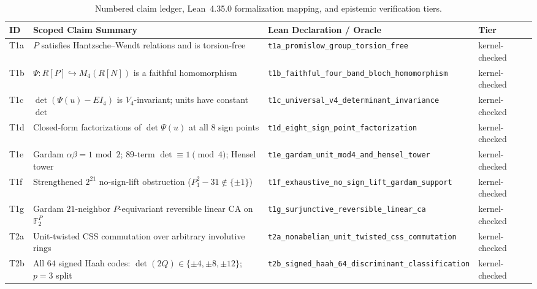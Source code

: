 \documentclass[11pt,reqno]{amsart}
\theoremstyle{definition}
\newcommand{\F}{\mathbb{F}}
\newcommand{\tierK}{\textsf{\scriptsize\textcolor{accentgreen}{kernel-checked}}}
\begin{document}
\begin{table}[htbp]
\centering
\caption{Numbered claim ledger, Lean~4.35.0 formalization mapping, and epistemic verification tiers.}
\label{tab:claims}
\scriptsize
\setlength{\tabcolsep}{3.5pt}
\begin{tabularx}{\textwidth}{@{}l>{\raggedright\arraybackslash}X>{\raggedright\arraybackslash}p{4.35cm}l@{}}
\toprule
\textbf{ID} & \textbf{Scoped Claim Summary} & \textbf{Lean Declaration / Oracle} & \textbf{Tier} \\
\midrule
\textsf{T1a} & $P$ satisfies Hantzsche--Wendt relations and is torsion-free & \texttt{t1a\_promislow\_group\_}\newline\texttt{torsion\_free} & \tierK{} \\
\textsf{T1b} & $\Psi : R[P] \hookrightarrow M_4(R[N])$ is a faithful homomorphism & \texttt{t1b\_faithful\_four\_band\_}\newline\texttt{bloch\_homomorphism} & \tierK{} \\
\textsf{T1c} & $\det(\Psi(u)-EI_4)$ is $V_4$-invariant; units have constant $\det$ & \texttt{t1c\_universal\_v4\_}\newline\texttt{determinant\_invariance} & \tierK{} \\
\textsf{T1d} & Closed-form factorizations of $\det\Psi(u)$ at all $8$ sign points & \texttt{t1d\_eight\_sign\_point\_}\newline\texttt{factorization} & \tierK{} \\
\textsf{T1e} & Gardam $\alpha\beta=1$ mod~$2$; $89$-term $\det \equiv 1 \pmod 4$; Hensel tower & \texttt{t1e\_gardam\_unit\_mod4\_}\newline\texttt{and\_hensel\_tower} & \tierK{} \\
\textsf{T1f} & Strengthened $2^{21}$ no-sign-lift obstruction ($P_1^2 - 31 \notin \{\pm 1\}$) & \texttt{t1f\_exhaustive\_no\_sign\_}\newline\texttt{lift\_gardam\_support} & \tierK{} \\
\textsf{T1g} & Gardam $21$-neighbor $P$-equivariant reversible linear CA on $\F_2^P$ & \texttt{t1g\_surjunctive\_}\newline\texttt{reversible\_linear\_ca} & \tierK{} \\
\textsf{T2a} & Unit-twisted CSS commutation over arbitrary involutive rings & \texttt{t2a\_nonabelian\_unit\_}\newline\texttt{twisted\_css\_commutation} & \tierK{} \\
\textsf{T2b} & All $64$ signed Haah codes: $\det(2Q) \in \{\pm 4,\pm 8,\pm 12\}$; $p=3$ split & \texttt{t2b\_signed\_haah\_64\_}\newline\texttt{discriminant\_classification} & \tierK{} \\

\end{tabularx}
\end{table}
\end{document}
